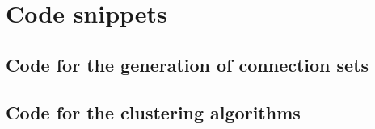 \section{Code snippets}%
\label{sec:Code for the connection set method}

\subsection{Code for the generation of connection sets}%
\label{sub:Code for the generation of connection sets}




\subsection{Code for the clustering algorithms}%
\label{sub:code for the clustering algorithms}



